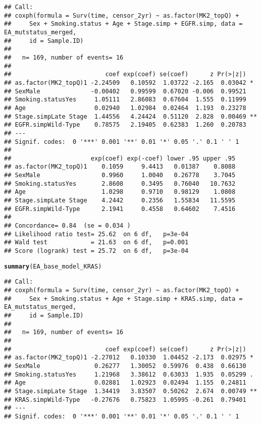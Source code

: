 \documentclass{article}\usepackage[]{graphicx}\usepackage[]{color}
\makeatletter
\newcommand{\hlstd}[1]{\textcolor[rgb]{0.345,0.345,0.345}{#1}}%
\newcommand{\hlkwd}[1]{\textcolor[rgb]{0.737,0.353,0.396}{\textbf{#1}}}%
\newenvironment{kframe}{%
 \def\at@end@of@kframe{}%
 \ifinner\ifhmode%
  \def\at@end@of@kframe{\end{minipage}}%
  \begin{minipage}{\columnwidth}%
 \fi\fi%
 \def\FrameCommand##1{\hskip\@totalleftmargin \hskip-\fboxsep
 \colorbox{shadecolor}{##1}\hskip-\fboxsep
     \hskip-\linewidth \hskip-\@totalleftmargin \hskip\columnwidth}%
 \MakeFramed {\advance\hsize-\width
   \@totalleftmargin\z@ \linewidth\hsize
   \@setminipage}}%
 {\par\unskip\endMakeFramed%
 \at@end@of@kframe}
\newenvironment{knitrout}{}{} %
\makeatother
\begin{document}
\begin{knitrout}
\begin{kframe}
\begin{alltt}
\end{alltt}
\begin{verbatim}
## Call:
## coxph(formula = Surv(time, censor_2yr) ~ as.factor(MK2_topQ) + 
##     Sex + Smoking.status + Age + Stage.simp + EGFR.simp, data = EA_mutstatus_merged, 
##     id = Sample.ID)
## 
##   n= 169, number of events= 16 
## 
##                          coef exp(coef) se(coef)      z Pr(>|z|)   
## as.factor(MK2_topQ)1 -2.24509   0.10592  1.03722 -2.165  0.03042 * 
## SexMale              -0.00402   0.99599  0.67020 -0.006  0.99521   
## Smoking.statusYes     1.05111   2.86083  0.67604  1.555  0.11999   
## Age                   0.02940   1.02984  0.02464  1.193  0.23278   
## Stage.simpLate Stage  1.44556   4.24424  0.51120  2.828  0.00469 **
## EGFR.simpWild-Type    0.78575   2.19405  0.62383  1.260  0.20783   
## ---
## Signif. codes:  0 '***' 0.001 '**' 0.01 '*' 0.05 '.' 0.1 ' ' 1
## 
##                      exp(coef) exp(-coef) lower .95 upper .95
## as.factor(MK2_topQ)1    0.1059     9.4413   0.01387    0.8088
## SexMale                 0.9960     1.0040   0.26778    3.7045
## Smoking.statusYes       2.8608     0.3495   0.76040   10.7632
## Age                     1.0298     0.9710   0.98129    1.0808
## Stage.simpLate Stage    4.2442     0.2356   1.55834   11.5595
## EGFR.simpWild-Type      2.1941     0.4558   0.64602    7.4516
## 
## Concordance= 0.84  (se = 0.034 )
## Likelihood ratio test= 25.62  on 6 df,   p=3e-04
## Wald test            = 21.63  on 6 df,   p=0.001
## Score (logrank) test = 25.72  on 6 df,   p=3e-04
\end{verbatim}
\begin{alltt}
\hlkwd{summary}\hlstd{(EA_base_model_KRAS)}
\end{alltt}
\begin{verbatim}
## Call:
## coxph(formula = Surv(time, censor_2yr) ~ as.factor(MK2_topQ) + 
##     Sex + Smoking.status + Age + Stage.simp + KRAS.simp, data = EA_mutstatus_merged, 
##     id = Sample.ID)
## 
##   n= 169, number of events= 16 
## 
##                          coef exp(coef) se(coef)      z Pr(>|z|)   
## as.factor(MK2_topQ)1 -2.27012   0.10330  1.04452 -2.173  0.02975 * 
## SexMale               0.26277   1.30052  0.59976  0.438  0.66130   
## Smoking.statusYes     1.21968   3.38612  0.63033  1.935  0.05299 . 
## Age                   0.02881   1.02923  0.02494  1.155  0.24811   
## Stage.simpLate Stage  1.34419   3.83507  0.50262  2.674  0.00749 **
## KRAS.simpWild-Type   -0.27676   0.75823  1.05995 -0.261  0.79401   
## ---
## Signif. codes:  0 '***' 0.001 '**' 0.01 '*' 0.05 '.' 0.1 ' ' 1

\end{verbatim}
\end{kframe}
\end{knitrout}
\end{document}
